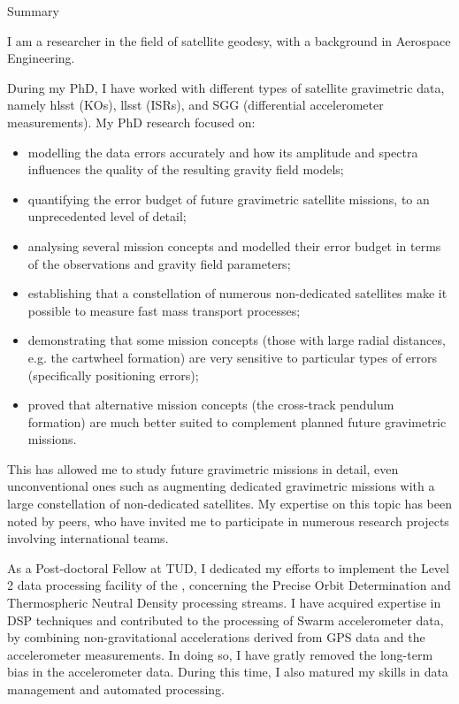 
\begin{cvtext}{Summary}

I am a researcher in the field of satellite geodesy, with a background in Aerospace Engineering.

During my PhD, I have worked with different types of satellite gravimetric data, namely \acl{hlsst} (\aclp{KO}), \acl{llsst} (\aclp{ISR}), and \acl{SGG} (differential accelerometer measurements).
My PhD research focused on:
\begin{itemize}[topsep=0pt,itemsep=1pt,parsep=0pt,partopsep=0pt]
\item modelling the data errors accurately and how its amplitude and spectra influences the quality of the resulting gravity field models;
\item quantifying the error budget of future gravimetric satellite missions, to an unprecedented level of detail;
\item analysing several mission concepts and modelled their error budget in terms of the observations and gravity field parameters;
\item establishing that a constellation of numerous non-dedicated satellites make it possible to measure fast mass transport processes;
\item demonstrating that some mission concepts (those with large radial distances, \acs{e.g.} the cartwheel formation) are very sensitive to particular types of errors (specifically positioning errors); %
\item proved that alternative mission concepts (the cross-track pendulum formation) are much better suited to complement planned future gravimetric missions.%
\end{itemize}
This has allowed me to study future gravimetric missions in detail, even unconventional ones such as augmenting dedicated gravimetric missions with a large constellation of non-dedicated satellites.
My expertise on this topic has been noted by peers, who have invited me to participate in numerous research projects involving international teams.

As a Post-doctoral Fellow at \ac{TUD}, I dedicated my efforts to implement the Level 2 data processing facility of the , concerning the Precise Orbit Determination and Thermospheric Neutral Density processing streams.
I have acquired expertise in \ac{DSP} techniques and contributed to the processing of Swarm accelerometer data, by combining non-gravitational accelerations derived from \ac{GPS} data and the accelerometer measurements.
In doing so, I have gratly removed the long-term bias in the accelerometer data.
During this time, I also matured my skills in data management and automated processing.


\end{cvtext}
